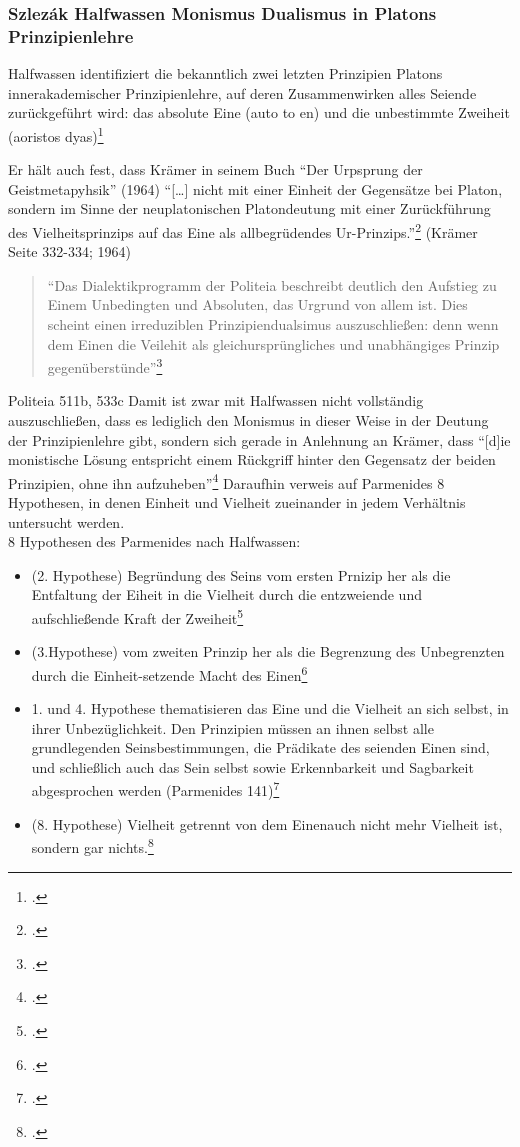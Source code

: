 \documentclass[12pt]{article}
\newcommand*{\zitatblock}[1]{%
    \begin{quote}
    \fontsize{10}{12}\selectfont
    \setlength{\parskip}{1.0em}
    #1
    \end{quote}
}
\begin{document}
\subsubsection*{Szlezák Halfwassen Monismus Dualismus in Platons Prinzipienlehre}

Halfwassen identifiziert die bekanntlich zwei letzten Prinzipien Platons innerakademischer Prinzipienlehre, auf deren Zusammenwirken alles Seiende zurückgeführt wird: das absolute Eine (auto to en) und die unbestimmte Zweiheit (aoristos dyas)\footcite[vgl.][S. 67]{HalfwassenMonismusDualismus}

Er hält auch fest, dass Krämer in seinem Buch \enquote{Der Urpsprung der Geistmetapyhsik} (1964) \enquote{[\dots] nicht mit einer Einheit der Gegensätze bei Platon, sondern im Sinne der neuplatonischen Platondeutung mit einer Zurückführung des Vielheitsprinzips auf das Eine als allbegrüdendes Ur-Prinzips.}\footcite[][S. 68]{HalfwassenMonismusDualismus} (Krämer Seite 332-334; 1964) 
\zitatblock{\enquote{Das Dialektikprogramm der Politeia beschreibt deutlich den Aufstieg zu Einem Unbedingten und Absoluten, das Urgrund von allem ist. Dies scheint einen irreduziblen Prinzipiendualsimus auszuschließen: denn wenn dem Einen die Veilehit als gleichursprüngliches und unabhängiges Prinzip gegenüberstünde}\footcite[][S. 70f.]{HalfwassenMonismusDualismus}} Politeia 511b, 533c
Damit ist zwar mit Halfwassen nicht vollständig auszuschließen, dass es lediglich den Monismus in dieser Weise in der Deutung der Prinzipienlehre gibt, sondern sich gerade in Anlehnung an Krämer, dass \enquote{[d]ie monistische Lösung entspricht einem Rückgriff hinter den Gegensatz der beiden Prinzipien, ohne ihn aufzuheben}\footcite[vgl.][S. 333]{Krämer1964Geistmetaphysik}
Daraufhin verweis auf Parmenides 8 Hypothesen, in denen Einheit und Vielheit zueinander in jedem Verhältnis untersucht werden.\\
8 Hypothesen des Parmenides nach Halfwassen:
\begin{itemize}
    \item {(2. Hypothese) Begründung des Seins vom ersten Prnizip her als die Entfaltung der Eiheit in die Vielheit durch die entzweiende und aufschließende Kraft der Zweiheit}\footcite[vgl.][S. 72]{HalfwassenMonismusDualismus}
    \item {(3.Hypothese) vom zweiten Prinzip her als die Begrenzung des Unbegrenzten durch die Einheit-setzende Macht des Einen}\footcite[vgl.][S. 72]{HalfwassenMonismusDualismus}
    \item {1. und 4. Hypothese thematisieren das Eine und die Vielheit an sich selbst, in ihrer Unbezüglichkeit. Den Prinzipien müssen an ihnen selbst alle grundlegenden Seinsbestimmungen, die Prädikate des seienden Einen sind, und schließlich auch das Sein selbst sowie Erkennbarkeit und Sagbarkeit abgesprochen werden (Parmenides 141)}\footcite[vgl.][S. 72]{HalfwassenMonismusDualismus}
    \item {(8. Hypothese) Vielheit getrennt von dem Einenauch nicht mehr Vielheit ist, sondern gar nichts.\footcite[vgl.][S. 73]{HalfwassenMonismusDualismus}}
\end{itemize}
\end{document}
